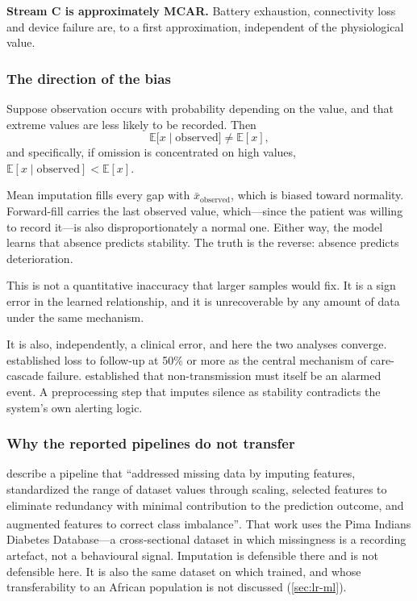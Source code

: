 \documentclass[12pt,a4paper,oneside]{report}
\newcommand{\bq}[1]{``#1''\textsuperscript{\dag}}
\begin{document}
\textbf{Stream C is approximately MCAR.} Battery exhaustion, connectivity loss and device failure are, to a first approximation, independent of the physiological value.

\subsubsection{The direction of the bias}\label{sec:bias-direction}

Suppose observation occurs with probability depending on the value, and that extreme values are less likely to be recorded. Then
\begin{equation}
  \mathbb{E}\bigl[x \mid \text{observed}\bigr] \neq \mathbb{E}[x],
\end{equation}
and specifically, if omission is concentrated on high values, $\mathbb{E}[x \mid \text{observed}] < \mathbb{E}[x]$.

Mean imputation fills every gap with $\bar{x}_{\text{observed}}$, which is biased toward normality. Forward-fill carries the last observed value, which---since the patient was willing to record it---is also disproportionately a normal one. Either way, the model learns that absence predicts stability. The truth is the reverse: absence predicts deterioration.

This is not a quantitative inaccuracy that larger samples would fix. It is a sign error in the learned relationship, and it is unrecoverable by any amount of data under the same mechanism.

It is also, independently, a clinical error, and here the two analyses converge.  established loss to follow-up at 50\% or more as the central mechanism of care-cascade failure.  established that non-transmission must itself be an alarmed event. A preprocessing step that imputes silence as stability contradicts the system's own alerting logic.

\subsubsection{Why the reported pipelines do not transfer}

\Textcite{liu2025review} describe a pipeline that \bq{addressed missing data by imputing features, standardized the range of dataset values through scaling, selected features to eliminate redundancy with minimal contribution to the prediction outcome, and augmented features to correct class imbalance}. That work uses the Pima Indians Diabetes Database---a cross-sectional dataset in which missingness is a recording artefact, not a behavioural signal. Imputation is defensible there and is not defensible here. It is also the same dataset on which \textcite{chatrati2022} trained, and whose transferability to an African population is not discussed (\cref{sec:lr-ml}).
\end{document}
